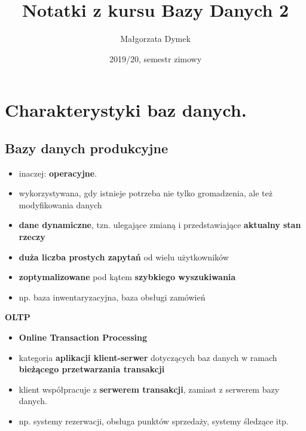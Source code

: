 \documentclass[a4paper]{article}
\title{Notatki z kursu Bazy Danych 2}
\author{Małgorzata Dymek}
\date{2019/20, semestr zimowy}
\begin{document}
    \maketitle

    \section{Charakterystyki baz danych.}

    \subsection{Bazy danych produkcyjne}
    \begin{itemize}
        \item inaczej: \textbf{operacyjne}.
        \item wykorzystywana, gdy istnieje potrzeba nie tylko gromadzenia, ale też modyfikowania danych
        \item \textbf{dane dynamiczne}, tzn. ulegające zmianą i przedstawiające \textbf{aktualny stan rzeczy}
        \item \textbf{duża liczba prostych zapytań} od wielu użytkowników
        \item \textbf{zoptymalizowane} pod kątem \textbf{szybkiego wyszukiwania}
        \item np. baza inwentaryzacyjna, baza obsługi zamówień
    \end{itemize}


    \textbf{OLTP}
    \begin{itemize}
        \item \textbf{Online Transaction Processing}
        \item kategoria \textbf{aplikacji klient-serwer} dotyczących baz danych w ramach \textbf{bieżącego
        przetwarzania transakcji}
        \item klient współpracuje z \textbf{serwerem transakcji}, zamiast z serwerem bazy danych.
        \item np. systemy rezerwacji, obsługa punktów sprzedaży, systemy śledzące itp.
    \end{itemize}
\end{document}
